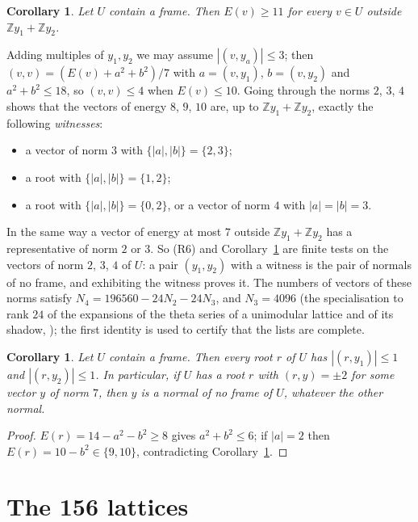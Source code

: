 \documentclass[11pt]{amsart}
\newtheorem{corollary}[theorem]{Corollary}
\theoremstyle{definition}
\theoremstyle{remark}
\newcommand{\Z}{\mathbb{Z}}
\begin{document}
\begin{corollary}\label{cor:E11}
Let $U$ contain a frame. Then $E(v)\ge 11$ for every $v\in U$ outside $\Z y_1+\Z y_2$.
\end{corollary}

Adding multiples of $y_1,y_2$ we may assume $|(v,y_a)|\le3$; then $(v,v)=(E(v)+a^2+b^2)/7$ with $a=(v,y_1)$, $b=(v,y_2)$ and
$a^2+b^2\le18$, so $(v,v)\le4$ when $E(v)\le10$. Going through the norms $2$, $3$, $4$ shows that the vectors of energy $8$,
$9$, $10$ are, up to $\Z y_1+\Z y_2$, exactly the following \emph{witnesses}:
\begin{itemize}[leftmargin=3.5em]
\item[(W8)] a vector of norm $3$ with $\{|a|,|b|\}=\{2,3\}$;
\item[(W9)] a root with $\{|a|,|b|\}=\{1,2\}$;
\item[(W10)] a root with $\{|a|,|b|\}=\{0,2\}$, or a vector of norm $4$ with $|a|=|b|=3$.
\end{itemize}
In the same way a vector of energy at most $7$ outside $\Z y_1+\Z y_2$ has a representative of norm $2$ or $3$. So (R6) and
Corollary~\ref{cor:E11} are finite tests on the vectors of norm $2$, $3$, $4$ of $U$: a pair $(y_1,y_2)$ with a witness is
the pair of normals of no frame, and exhibiting the witness proves it. The numbers of vectors of these norms satisfy $N_4=196560-24N_2-24N_3$, and $N_3=4096$ (the specialisation to rank $24$ of the expansions of the theta series
of a unimodular lattice and of its shadow, \cite[\S2]{CS90}); the first identity is used to certify that the lists are complete.

\begin{corollary}\label{cor:Y1}
Let $U$ contain a frame. Then every root $r$ of $U$ has $|(r,y_1)|\le1$ and $|(r,y_2)|\le1$. In particular, if $U$ has a root
$r$ with $(r,y)=\pm2$ for some vector $y$ of norm $7$, then $y$ is a normal of no frame of $U$, whatever the other normal.
\end{corollary}

\begin{proof}
$E(r)=14-a^2-b^2\ge8$ gives $a^2+b^2\le6$; if $|a|=2$ then $E(r)=10-b^2\in\{9,10\}$, contradicting
Corollary~\ref{cor:E11}.
\end{proof}

\section{The 156 lattices}\label{sec:lattices}
\end{document}
